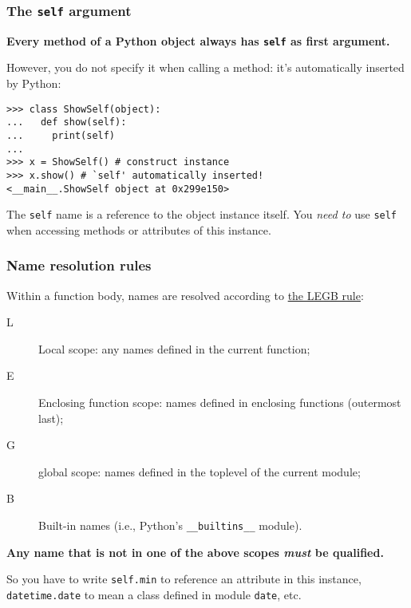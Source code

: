 \documentclass[english,serif,mathserif,xcolor=pdftex,dvipsnames,table]{beamer}
\begin{document}
\begin{frame}[fragile]
  \frametitle{The \texttt{self} argument}

  \textbf{Every method of a Python object always has \texttt{self}
    as first argument.}

  \+
  However, you do not specify it when calling a method: it's
  automatically inserted by Python:
\begin{lstlisting}
>>> class ShowSelf(object):
...   def show(self):
...     print(self)
... 
>>> x = ShowSelf() # construct instance
>>> x.show() # `self' automatically inserted!
<__main__.ShowSelf object at 0x299e150>
\end{lstlisting}

  \+ 
  The \texttt{self} name is a reference to the object instance
  itself.  You \emph{need to} use \texttt{self} when accessing methods
  or attributes of this instance.
\end{frame}


\begin{frame}[fragile]
  \frametitle{Name resolution rules}
  \small

  Within a function body, names are resolved according to \href{http://stackoverflow.com/questions/291978/short-description-of-python-scoping-rules/292502#292502}{the LEGB rule}:
  \begin{description}
  \item[L] Local scope: any names defined in the current function;
  \item[E] Enclosing function scope: names defined in enclosing
    functions (outermost last);
  \item[G] global scope: names defined in the toplevel of the current module;
  \item[B] Built-in names (i.e., Python's \texttt{\_\_builtins\_\_} module).
  \end{description}

  \+
  \textbf{Any name that is not in one of the above scopes \emph{must}
    be qualified.}

  \+
  So you have to write \texttt{self.min} to reference an attribute in
  this instance, \texttt{datetime.date} to mean a class defined in module
  \texttt{date}, etc.

\end{frame}
\end{document}
